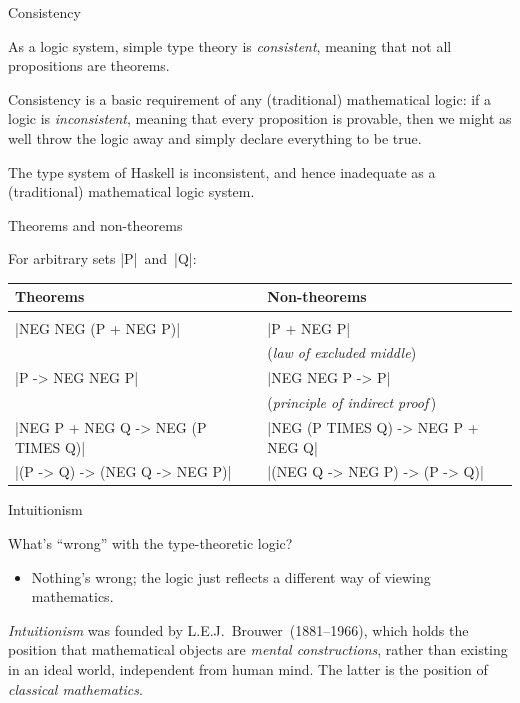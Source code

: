 \documentclass[t,compress,hyperref={hidelinks}]{beamer}
\begin{document}
\begin{frame}{Consistency}

As a logic system, simple type theory is \emph{consistent}, meaning that not all propositions are theorems.

Consistency is a basic requirement of any (traditional) mathematical logic: if a logic is \emph{inconsistent}, meaning that every proposition is provable, then we might as well throw the logic away and simply declare everything to be true.

The type system of Haskell is inconsistent, and hence inadequate as a (traditional) mathematical logic system.

\end{frame}

\begin{frame}{Theorems and non-theorems}

For arbitrary sets |P|~and~|Q|:
\begin{center}
\begin{tabular}{ll}
Theorems & Non-theorems \\ \hline \\[-2ex]
|NEG NEG (P + NEG P)| & |P + NEG P| \\
& (\emph{law of excluded middle}) \\
|P -> NEG NEG P| & |NEG NEG P -> P| \\
& (\emph{principle of indirect proof}\,) \\
|NEG P + NEG Q -> NEG (P TIMES Q)| & |NEG (P TIMES Q) -> NEG P + NEG Q| \\
|(P -> Q) -> (NEG Q -> NEG P)| & |(NEG Q -> NEG P) -> (P -> Q)|
\end{tabular}
\end{center}

\end{frame}

\begin{frame}{Intuitionism}

What's ``wrong'' with the type-theoretic logic?
\begin{itemize}
\item Nothing's wrong; the logic just reflects a different way of viewing mathematics.
\end{itemize}

\emph{Intuitionism} was founded by L.E.J.~Brouwer~(1881--1966), which holds the position that mathematical objects are \emph{mental constructions}, rather than existing in an ideal world, independent from human mind.
The latter is the position of \emph{classical mathematics}.



\end{frame}
\end{document}
